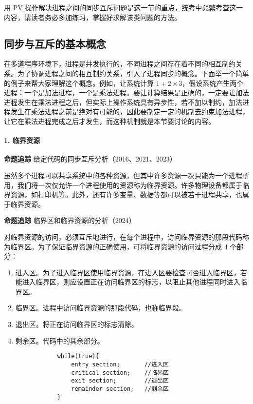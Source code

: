 \documentclass{ctexbook}
\begin{document}
	用 PV 操作解决进程之间的同步互斥问题是这一节的重点，统考中频繁考查这一内容，请读者务必多加练习，掌握好求解该类问题的方法。
	
	\subsection{同步与互斥的基本概念}
	
	在多道程序环境下，进程是并发执行的，不同进程之间存在着不同的相互制约关系。为了协调进程之间的相互制约关系，引入了进程同步的概念。下面举一个简单的例子来帮大家理解这个概念。例如，让系统计算 $1 + 2 \times 3$，假设系统产生两个进程：一个是加法进程，一个是乘法进程。要让计算结果是正确的，一定要让加法进程发生在乘法进程之后，但实际上操作系统具有异步性，若不加以制约，加法进程发生在乘法进程之前是绝对有可能的，因此要制定一定的机制去约束加法进程，让它在乘法进程完成之后才发生，而这种机制就是本节要讨论的内容。
	
	\paragraph{1. 临界资源}
	
	\textbf{命题追踪} 给定代码的同步互斥分析（2016、2021、2023）
	
	虽然多个进程可以共享系统中的各种资源，但其中许多资源一次只能为一个进程所用，我们将一次仅允许一个进程使用的资源称为临界资源。许多物理设备都属于临界资源，如打印机等。此外，还有许多变量、数据等都可以被若干进程共享，也属于临界资源。
	
	\textbf{命题追踪} 临界区和临界资源的分析（2024）
	
	对临界资源的访问，必须互斥地进行，在每个进程中，访问临界资源的那段代码称为临界区。为了保证临界资源的正确使用，可将临界资源的访问过程分成 4 个部分：
	\begin{enumerate}
		\item 进入区。为了进入临界区使用临界资源，在进入区要检查可否进入临界区，若能进入临界区，则应设置正在访问临界区的标志，以阻止其他进程同时进入临界区。
		\item 临界区。进程中访问临界资源的那段代码，也称临界段。
		\item 退出区。将正在访问临界区的标志清除。
		\item 剩余区。代码中的其余部分。
		\begin{lstlisting}
			while(true){
				entry section;       //进入区
				critical section;    //临界区
				exit section;        //退出区
				remainder section;   //剩余区
			}
		\end{lstlisting}
	\end{enumerate}
	
\end{document}
